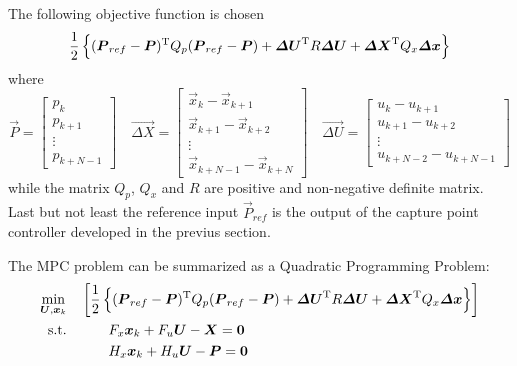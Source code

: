 The following objective function is chosen
\[
\frac{1}{2} \left\{ (\boldsymbol{P}_{ref} - \boldsymbol{P})^{\mathrm{T}} Q_p (\boldsymbol{P}_{ref} - \boldsymbol{P}) +
\boldsymbol{\Delta U} ^{\mathrm{T}} R \boldsymbol{\Delta U} + 
\boldsymbol{\Delta X} ^{\mathrm{T}} Q_x \boldsymbol{\Delta x} \right\}
\]
where
\[
\vec{P} =
\begin{bmatrix}
  p_k \\
  p_{k + 1} \\
  \vdots \\
  p_{k + N -1}
\end{bmatrix} \quad
\vec{\Delta X} =
\begin{bmatrix}
  \vec{x}_k - \vec{x}_{k+1} \\
  \vec{x}_{k + 1} - \vec{x}_{k + 2} \\
  \vdots \\
  \vec{x}_{k + N - 1} - \vec{x}_{k + N}
\end{bmatrix} \quad
\vec{\Delta U} =
\begin{bmatrix}
  u_k - u_{k+1} \\
  u_{k + 1} - u_{k + 2} \\
  \vdots \\
  u_{k + N - 2} - u_{k + N - 1}
\end{bmatrix}
\]
while the matrix $Q_p$, $Q_x$ and $R$ are positive and non-negative definite matrix.
Last but not least the reference input $\vec{P}_{ref}$ is the output of the capture point controller
developed in the previus section.
\par
The MPC problem can be summarized as a Quadratic Programming Problem:
\[
\begin{split}
  \min_{\boldsymbol{U}, \boldsymbol{x}_k} &  \quad \left[\frac{1}{2} \left\{ (\boldsymbol{P}_{ref} - \boldsymbol{P})^{\mathrm{T}} Q_p (\boldsymbol{P}_{ref} - \boldsymbol{P}) +
\boldsymbol{\Delta U} ^{\mathrm{T}} R \boldsymbol{\Delta U} + 
\boldsymbol{\Delta X} ^{\mathrm{T}} Q_x \boldsymbol{\Delta x} \right\} \right ]\\
  \text{s.t.} & \quad \quad \quad  F_{x} \boldsymbol{x}_k + F_{u} \boldsymbol{U} - \boldsymbol{X} = \boldsymbol{0}\\
  & \quad \quad \quad  H_{x} \boldsymbol{x}_k + H_{u} \boldsymbol{U} - \boldsymbol{P} = \boldsymbol{0}
\end{split}
\]
